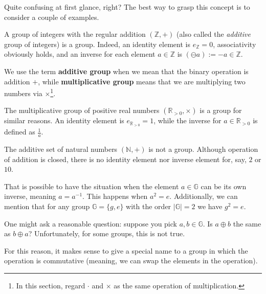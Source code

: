 \documentclass[../lecture-notes.tex]{subfiles}
\begin{document}
Quite confusing at first glance, right? The best way to grasp this concept is to consider a couple of examples.

\begin{example}
    A group of integers with the regular addition $(\mathbb{Z},+)$ (also called the \textit{additive} group of integers) is a group. Indeed, an identity element is $e_{\mathbb{Z}}=0$, associativity obviously holds, and an inverse for each element $a \in \mathbb{Z}$ is $(\ominus a) := -a \in \mathbb{Z}$. 
\end{example}

\begin{remark}
    We use the term \textbf{additive group} when we mean that the binary operation is addition $+$, while \textbf{multiplicative group} means that we are multiplying two numbers via $\times$\footnote{In this section, regard $\cdot$ and $\times$ as the same operation of multiplication.}.
\end{remark}

\begin{example}
    The multiplicative group of positive real numbers $(\mathbb{R}_{> 0}, \times)$ is a group for similar reasons. An identity element is $e_{\mathbb{R}_{>0}} = 1$, while the inverse for $a \in \mathbb{R}_{>0}$ is defined as $\frac{1}{a}$.
\end{example}

\begin{example}
    The additive set of natural numbers $(\mathbb{N}, +)$ is not a group. Although operation of addition is closed, there is no identity element nor inverse element for, say, $2$ or $10$.
\end{example}

\begin{example}
    That is possible to have the situation when the element $a \in \mathbb{G}$ can be its own inverse, meaning $a = a^{-1}$. This happens when $a^2 = e$. Additionally, we can mention that for any group $\mathbb{G} = \{g, e\}$ with the order $|\mathbb{G}| = 2$ we have $g^2 = e$.
\end{example}

One might ask a reasonable question: suppose you pick $a,b \in \mathbb{G}$. Is $a \oplus b$ the same as $b \oplus a$? Unfortunately, for some groups, this is not true. 

For this reason, it makes sense to give a special name to a group in which the operation is commutative (meaning, we can swap the elements in the operation).
\end{document}
